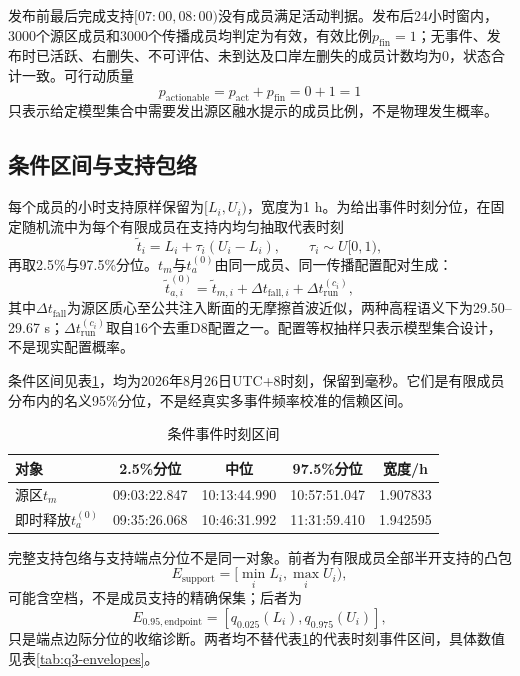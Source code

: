 发布前最后完成支持$[07{:}00,08{:}00)$没有成员满足活动判据。发布后24小时窗内，3000个源区成员和3000个传播成员均判定为有效，有效比例$p_{\mathrm{fin}}=1$；无事件、发布时已活跃、右删失、不可评估、未到达及口岸左删失的成员计数均为0，状态合计一致。可行动质量
\begin{equation}
p_{\mathrm{actionable}}=p_{\mathrm{act}}+p_{\mathrm{fin}}=0+1=1
\end{equation}
只表示给定模型集合中需要发出源区融水提示的成员比例，不是物理发生概率。

\subsection{条件区间与支持包络}
每个成员的小时支持原样保留为$[L_i,U_i)$，宽度为1 h。为给出事件时刻分位，在固定随机流中为每个有限成员在支持内均匀抽取代表时刻
\begin{equation}
\tilde t_i=L_i+\tau_i(U_i-L_i),\qquad \tau_i\sim U[0,1),
\end{equation}
再取2.5\%与97.5\%分位。$t_m$与$t_a^{(0)}$由同一成员、同一传播配置配对生成：
\begin{equation}
\tilde t_{a,i}^{(0)}=\tilde t_{m,i}+\Delta t_{\mathrm{fall},i}
+\Delta t_{\mathrm{run}}^{(c_i)},
\end{equation}
其中$\Delta t_{\mathrm{fall}}$为源区质心至公共注入断面的无摩擦首波近似，两种高程语义下为29.50--29.67 s；$\Delta t_{\mathrm{run}}^{(c_i)}$取自16个去重D8配置之一。配置等权抽样只表示模型集合设计，不是现实配置概率。

条件区间见表\ref{tab:q3-event-intervals}，均为2026年8月26日UTC+8时刻，保留到毫秒。它们是有限成员分布内的名义95\%分位，不是经真实多事件频率校准的信赖区间。

\begin{table}[htbp]\centering\footnotesize
\caption{条件事件时刻区间}\label{tab:q3-event-intervals}
\begin{tabular}{@{}l c c c c@{}}\toprule
对象&2.5\%分位&中位&97.5\%分位&宽度/h\\\midrule
源区$t_m$&09:03:22.847&10:13:44.990&10:57:51.047&1.907833\\
即时释放$t_a^{(0)}$&09:35:26.068&10:46:31.992&11:31:59.410&1.942595\\
\bottomrule
\end{tabular}\end{table}

完整支持包络与支持端点分位不是同一对象。前者为有限成员全部半开支持的凸包
\begin{equation}
E_{\mathrm{support}}=[\min_i L_i,\max_i U_i),
\end{equation}
可能含空档，不是成员支持的精确保集；后者为
\begin{equation}
E_{0.95,\mathrm{endpoint}}=[q_{0.025}(L_i),q_{0.975}(U_i)],
\end{equation}
只是端点边际分位的收缩诊断。两者均不替代表\ref{tab:q3-event-intervals}的代表时刻事件区间，具体数值见表\ref{tab:q3-envelopes}。


